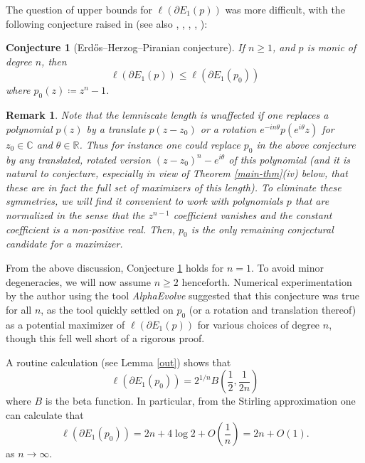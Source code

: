 \documentclass[12pt]{amsart}
\newtheorem{conjecture}{Conjecture}[section]
\newtheorem{remark}{Remark}[section]
\newcommand{\R}{\mathbb{R}}
\newcommand{\C}{\mathbb{C}}
\begin{document}
The question of upper bounds for $\ell(\partial E_1(p))$ was more difficult, with the following conjecture raised in \cite[Problem 12]{EHP} (see also \cite[p. 247]{er61}, \cite{er82e}, \cite{er90}, \cite{er97f}, \cite[Problem 114]{bloom}):

\begin{conjecture}[Erd\H{o}s--Herzog--Piranian conjecture]\label{ehp-conj}  If $n \geq 1$, and $p$ is monic of degree $n$, then
$$ \ell(\partial E_1(p)) \leq \ell(\partial E_1(p_0))$$
where $p_0(z) \coloneqq z^n-1$.
\end{conjecture}

\begin{remark}\label{normalize-rem} Note that the lemniscate length is unaffected if one replaces a polynomial $p(z)$ by a translate $p(z-z_0)$ or a rotation $e^{-in\theta} p(e^{i\theta} z)$ for $z_0 \in \C$ and $\theta \in \R$.  Thus for instance one could replace $p_0$ in the above conjecture by any translated, rotated version $(z-z_0)^n - e^{i\theta}$ of this polynomial (and it is natural to conjecture, especially in view of Theorem \ref{main-thm}(iv) below, that these are in fact the full set of maximizers of this length).  To eliminate these symmetries, we will find it convenient to work with polynomials $p$ that are \emph{normalized} in the sense that the $z^{n-1}$ coefficient vanishes and the constant coefficient is a non-positive real.  Then, $p_0$ is the only remaining conjectural candidate for a maximizer.
\end{remark}

From the above discussion, Conjecture \ref{ehp-conj} holds for $n=1$. To avoid minor degeneracies, we will now assume $n \geq 2$ henceforth.  Numerical experimentation by the author using the tool \emph{AlphaEvolve} suggested that this conjecture was true for all $n$, as the tool quickly settled on $p_0$ (or a rotation and translation thereof) as a potential maximizer of $\ell(\partial E_1(p))$ for various choices of degree $n$, though this fell well short of a rigorous proof.



A routine calculation (see Lemma \ref{out}) shows that
\begin{equation}\label{lbo}
 \ell(\partial E_1(p_0)) = 2^{1/n} B\left( \frac{1}{2}, \frac{1}{2n} \right)
\end{equation}
where $B$ is the beta function.  In particular, from the Stirling approximation one can calculate that
\begin{equation}\label{ep0}
     \ell(\partial E_1(p_0)) = 2n + 4 \log 2 + O\left(\frac{1}{n}\right) = 2n + O(1).
\end{equation}
as $n \to \infty$.
\end{document}
